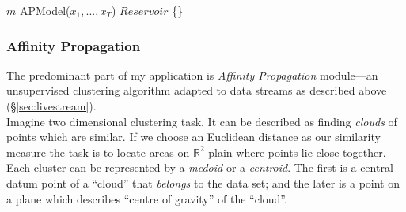 \documentclass[11pt, letterpaper]{article}            %
\begin{document}
\SetAlCapSkip{1em}
\LinesNumbered
{}
\vspace{2cm}
\begin{algorithm}[h]

  $m$ \leftarrow APModel($x_1, ..., x_T$)\;
  $Reservoir$ \leftarrow \{\}\;

\end{algorithm}
\vspace{1cm}


\subsubsection{Affinity Propagation\label{sec:AfinProp}}
The predominant part of my application is \emph{Affinity Propagation} module---an unsupervised clustering algorithm adapted to data streams as described above (§\ref{sec:livestream}).\\

Imagine two dimensional clustering task. It can be described as finding \emph{clouds} of points which are similar. If we choose an Euclidean distance as our similarity measure the task is to locate areas on $\mathbb{R}^2$ plain where points lie close together.\\
Each cluster can be represented by a \emph{medoid} or a \emph{centroid}. The first is a central datum point of a ``cloud'' that \emph{belongs} to the data set; and the later is a point on a plane which describes ``centre of gravity'' of the ``cloud''.\\
\end{document}
